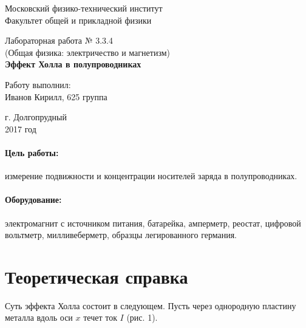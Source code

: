 \documentclass[12pt]{kiarticle} %
\begin{document}
	
	\begin{titlepage}
		\begin{center}
			\large 	Московский физико-технический институт \\
			Факультет общей и прикладной физики \\
			\vspace{0.2cm}
			
			\vspace{4.5cm}
			Лабораторная работа № 3.3.4 \\ \vspace{0.2cm}
			\large (Общая физика: электричество и магнетизм) \\ \vspace{0.2cm}
			\LARGE \textbf{Эффект Холла в полупроводниках}
		\end{center}
		\vspace{2.3cm} \large
		
		\begin{center}
			Работу выполнил: \\
			Иванов Кирилл,
			625 группа
			\vspace{10mm}		
			
		\end{center}
		
		\begin{center} \vspace{60mm}
			г. Долгопрудный \\
			2017 год
		\end{center}
	\end{titlepage}
	
	
	\paragraph*{Цель работы:} измерение подвижности и концентрации носителей заряда в полупроводниках.
	
	\paragraph*{Оборудование:} электромагнит с источником питания, батарейка, амперметр, реостат, цифровой вольтметр, милливеберметр, образцы легированного германия.
	
	\section{Теоретическая справка}
	Суть эффекта Холла состоит в следующем. Пусть через однородную пластину металла вдоль оси $x$ течет ток $I$ (рис. 1).
	
\end{document}
